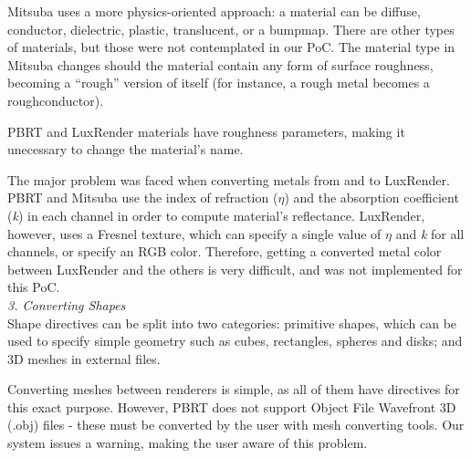Mitsuba uses a more physics-oriented approach: a material can be diffuse,
conductor, dielectric, plastic, translucent, or a bumpmap.
There are other types of materials, but those were not contemplated in our PoC.
The material type in Mitsuba changes should the material contain any form of
surface roughness, becoming a ``rough'' version of itself (for instance, a rough
metal becomes a roughconductor).

PBRT and LuxRender materials have roughness parameters, making it unecessary to
change the material's name.

The major problem was faced when converting metals from and to LuxRender. PBRT 
and Mitsuba use the index of refraction ($\eta$) and the absorption 
coefficient (\textit{k}) in each channel in order to compute material's 
reflectance. LuxRender, however, uses a Fresnel texture, which can specify a 
single value of $\eta$ and \textit{k} for all channels, or specify an RGB 
color. Therefore, getting a converted metal color between LuxRender and the 
others is very difficult, and was not implemented for this PoC. \\

\textit{3. Converting Shapes} \\
Shape directives can be split into two categories: primitive shapes, which can
be used to specify simple geometry such as cubes, rectangles, spheres and disks;
and 3D meshes in external files.

Converting meshes between renderers is simple, as all of them have directives
for this exact purpose. However, PBRT does not support Object File Wavefront 3D
(.obj) files - these must be converted by the user with mesh converting tools.
Our system issues a warning, making the user aware of this problem.



